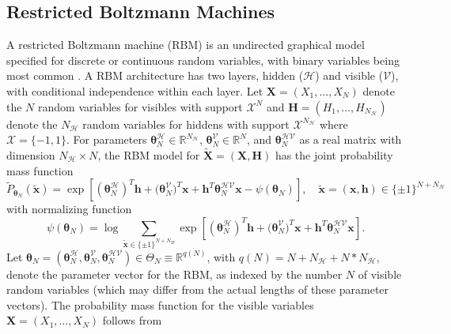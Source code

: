 \documentclass[numbib]{imamat}
\theoremstyle{theorem}
\theoremstyle{lemma}
\theoremstyle{example}
\theoremstyle{corollary}
\theoremstyle{definition}
\theoremstyle{remark}
\theoremstyle{approximation}
\theoremstyle{scheme}
\begin{document}
\hypertarget{rbm}{%
\subsection{Restricted Boltzmann Machines}\label{rbm}}

A restricted Boltzmann machine (RBM) is an undirected graphical model
specified for discrete or continuous random variables, with binary
variables being most common \citep[cf.][]{smolensky1986information}. A
RBM architecture has two layers, hidden (\(\mathcal{H}\)) and visible
(\(\mathcal{V}\)), with conditional independence within each layer. Let
\(\boldsymbol X = (X_1,\ldots,X_N)\) denote the \(N\) random variables
for visibles with support \(\mathcal{X}^N\) and
\(\boldsymbol H = (H_1,\ldots,H_{N_\mathcal{H}})\) denote the
\(N_\mathcal{H}\) random variables for hiddens with support
\(\mathcal{X}^{N_\mathcal{H}}\) where \(\mathcal{X} = \{-1,1\}\). For
parameters
\(\boldsymbol \theta_N^{\mathcal{H}} \in \mathbb{R}^{N_\mathcal{H}}\),
\(\boldsymbol \theta_N^{\mathcal{V}}\in \mathbb{R}^N\), and
\(\boldsymbol \theta_N^{\mathcal{HV}}\) as a real matrix with dimension
\(N_\mathcal{H} \times N\), the RBM model for
\(\tilde{\boldsymbol X}=(\boldsymbol X,\boldsymbol H)\) has the joint
probability mass function \begin{equation}
\label{eq:RBM1}
\tilde{P}_{\boldsymbol \theta_N} (\tilde{\boldsymbol x}) = \exp\left[ (\boldsymbol \theta_N^{\mathcal{H}})^T \boldsymbol h + \boldsymbol (\boldsymbol \theta_N^{\mathcal{V}})^T \boldsymbol x + \boldsymbol h^T  \boldsymbol\theta_N^{\mathcal{HV}} \boldsymbol x - \psi(\boldsymbol \theta_N)\right], \quad \tilde{\boldsymbol x} = (\boldsymbol x, \boldsymbol h) \in \{\pm 1\}^{N+N_\mathcal{H}}
\end{equation} with normalizing function \[
\psi(\boldsymbol \theta_N) = \log \sum_{\tilde{\boldsymbol x} \in \{\pm 1\}^{N+N_H} } \exp\left[ (\boldsymbol \theta_N^{\mathcal{H}})^T \boldsymbol h + \boldsymbol (\boldsymbol \theta_N^{\mathcal{V}})^T \boldsymbol x + \boldsymbol h^T  \boldsymbol\theta_N^{\mathcal{HV}} \boldsymbol x\right].
\] Let
\(\boldsymbol \theta_N = (\boldsymbol \theta_N^{\mathcal{H}}, \boldsymbol \theta_N^{\mathcal{V}}, \boldsymbol\theta_N^{\mathcal{HV}} ) \in \Theta_N \equiv \mathbb{R}^{q(N)}\),
with \(q(N) = N + N_\mathcal{H} + N*N_\mathcal{H}\), denote the
parameter vector for the RBM, as indexed by the number \(N\) of visible
random variables (which may differ from the actual lengths of these
parameter vectors). The probability mass function for the visible
variables \(\boldsymbol X = (X_1, \dots, X_N)\) follows from
\end{document}
